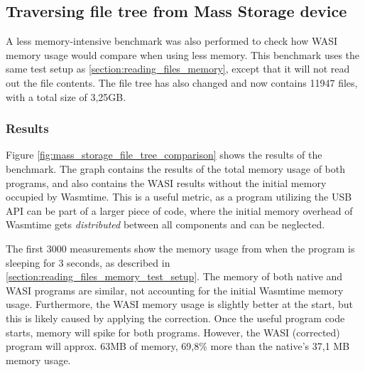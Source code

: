 \subsection{Traversing file tree from Mass Storage device}
\label{section:travering_file_tree_memory}
A less memory-intensive benchmark was also performed to check how \acrshort{WASI} memory usage would compare when using less memory. This benchmark uses the same test setup as \ref{section:reading_files_memory}, except that it will not read out the file contents. The file tree has also changed and now contains 11947 files, with a total size of 3,25GB.

\subsubsection{Results}

Figure \ref{fig:mass_storage_file_tree_comparison} shows the results of the benchmark. The graph contains the results of the total memory usage of both programs, and also contains the \acrshort{WASI} results without the initial memory occupied by Wasmtime. This is a useful metric, as a program utilizing the \acrshort{USB} \acrshort{API} can be part of a larger piece of code, where the initial memory overhead of Wasmtime gets \textit{distributed} between all components and can be neglected.

The first 3000 measurements show the memory usage from when the program is sleeping for 3 seconds, as described in \ref{section:reading_files_memory_test_setup}. The memory of both native and \acrshort{WASI} programs are similar, not accounting for the initial Wasmtime memory usage. Furthermore, the \acrshort{WASI} memory usage is slightly better at the start, but this is likely caused by applying the correction. Once the useful program code starts, memory will spike for both programs. However, the \acrshort{WASI} (corrected) program will approx. 63MB of memory, 69,8\% more than the native's 37,1 MB memory usage.

